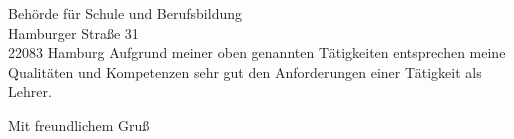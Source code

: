 \documentclass[ebner,paper=a4,fontsize=11pt,ngerman,BCOR=10mm]{scrlttr2}%
\begin{document}
\begin{letter}{ Beh{\"o}rde f{\"u}r Schule und Berufsbildung\\
Hamburger Stra{\ss}e 31\\ 
22083 Hamburg}
Aufgrund meiner oben genannten T{\"a}tigkeiten entsprechen meine Qualit{\"a}ten und
Kompetenzen sehr gut den Anforderungen einer T{\"a}tigkeit als Lehrer. 


\closing{Mit freundlichem Gru\ss}
\enlargethispage{6\baselineskip}

\end{letter}
\end{document}
